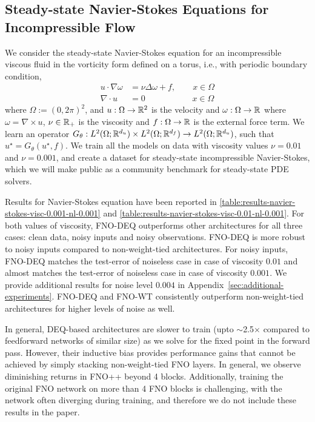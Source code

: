 \subsection{Steady-state Navier-Stokes Equations for Incompressible Flow}
\label{subsec:navier_stokes}
We consider the steady-state Navier-Stokes equation for an incompressible viscous fluid in the vorticity form
defined on a torus, i.e., with periodic boundary condition,
\begin{equation}
    \begin{split}
        \label{eq:navier_stokes}
        u \cdot \nabla \omega &= \nu \Delta \omega + f, \qquad x \in \Omega\\
        \nabla \cdot u &= 0 \qquad\qquad\quad\;\;  x \in \Omega
    \end{split}
\end{equation}
where $\Omega:=(0, 2\pi)^2$, and $u:\Omega \to \mathbb{R}^2$ is the velocity and 
$\omega:\Omega \to \mathbb{R}$ where $\omega = \nabla \times u$, $\nu \in \mathbb{R}_+$ is the viscosity 
and $f: \Omega \to \mathbb{R}$ is the external force term.
We learn an operator $G_\theta: L^2(\Omega; \mathbb{R}^{d_u}) \times L^2(\Omega; \mathbb{R}^{d_f}) \to L^2(\Omega; \mathbb{R}^{d_u})$, such that 
$u^\star = G_\theta(u^\star, f)$.
We train all the models on data with viscosity values $\nu = 0.01$ and $\nu=0.001$, and create a dataset
for steady-state incompressible
Navier-Stokes, which we will make public as a community benchmark
for steady-state PDE solvers.

Results for Navier-Stokes equation have been reported in \cref{table:results-navier-stokes-visc-0.001-nl-0.001} and \cref{table:results-navier-stokes-visc-0.01-nl-0.001}. For both values of viscosity, FNO-DEQ outperforms other architectures for all three cases: clean data, noisy inputs and noisy observations. 
FNO-DEQ is more robust to noisy inputs compared to non-weight-tied architectures. 
For noisy inputs, FNO-DEQ matches the test-error of noiseless case in case of viscosity $0.01$ and almost matches the test-error of noiseless case in case of viscosity $0.001$. 
We provide additional results for noise level $0.004$ in Appendix~\ref{sec:additional-experiments}. %
FNO-DEQ and FNO-WT consistently outperform non-weight-tied architectures for higher levels of noise as well.

In general, DEQ-based architectures are slower to train  (upto $\sim$2.5$\times$ compared to feedforward networks of similar size) as we solve for the fixed point in the forward pass. 
However, their inductive bias provides performance gains that cannot be achieved by simply stacking non-weight-tied FNO layers. In general, we observe diminishing returns in FNO++ beyond 4 blocks. Additionally, training the original FNO network on more than 4 FNO blocks is challenging, with the network often diverging during training, and therefore we do not include these results in the paper.

